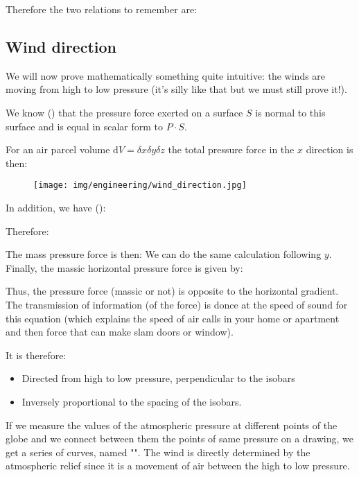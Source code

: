 	Therefore the two relations to remember are:
	
	
	\pagebreak
	\subsection{Wind direction}
	We will now prove mathematically something quite intuitive: the winds are moving from high to low pressure (it's silly like that but we must still prove it!).

	We know () that the pressure force exerted on a surface $S$ is normal to this surface and is equal in scalar form to $P\cdot S$.
	
	For an air parcel volume $\mathrm{d}V=\delta x\delta y\delta z$ the total pressure force in the $x$ direction is then:
	
	\begin{figure}[H]
		\begin{center}
		\texttt{[image: img/engineering/wind\_direction.jpg]}
		\end{center}	
	\end{figure}
	In addition, we have ():
	
	Therefore:
	
	The mass pressure force is then:
	We can do the same calculation following $y$. Finally, the massic horizontal pressure force is given by:
	
	Thus, the pressure force (massic or not) is opposite to the horizontal gradient. The transmission of information (of the force) is donce at the speed of sound for this equation (which explains the speed of air calls in your home or apartment and then force that can make slam doors or window).

It is therefore:

	\begin{itemize}
		\item  Directed from high to low pressure, perpendicular to the isobars

		\item Inversely proportional to the spacing of the isobars.
	\end{itemize}
	If we measure the values of the atmospheric pressure at different points of the globe and we connect between them the points of same pressure on a drawing, we get a series of curves, named "". The wind is directly determined by the atmospheric relief since it is a movement of air between the high to low pressure.

